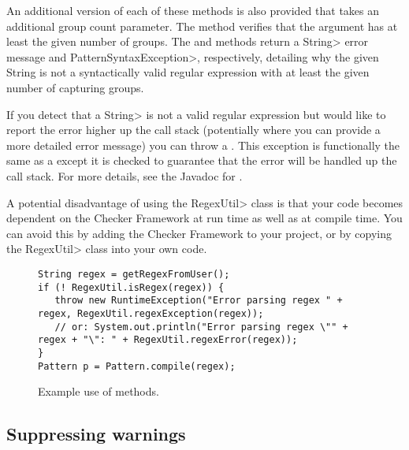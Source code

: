 An additional version of each of these methods is also provided that takes
an additional group count parameter. The
 method
verifies that the argument has at least the given number of groups. The
 and
methods return a \<String> error message and \<Pattern\-Syntax\-Exception>,
respectively, detailing why the given String is not a syntactically valid
regular expression with at least the given number of capturing groups.

If you detect that a \<String> is not a valid regular expression but would like
to report the error higher up the call stack (potentially where you can
provide a more detailed error message) you can throw a
. This exception is
functionally the same as a
except it is checked to guarantee that the error will be handled up the
call stack.  For more details, see the Javadoc for
.

A potential disadvantage of using the \<RegexUtil> class is that your code becomes
dependent on the Checker Framework at run time as well as at compile time.
You can avoid this by adding the Checker Framework to your project, or by
copying the \<RegexUtil> class into
your own code.

\begin{figure}
\begin{smaller}
\begin{Verbatim}
String regex = getRegexFromUser();
if (! RegexUtil.isRegex(regex)) {
   throw new RuntimeException("Error parsing regex " + regex, RegexUtil.regexException(regex));
   // or: System.out.println("Error parsing regex \"" + regex + "\": " + RegexUtil.regexError(regex));
}
Pattern p = Pattern.compile(regex);
\end{Verbatim}
\end{smaller}
\caption{Example use of  methods.}
\label{fig-regex-util-example}
\end{figure}


\subsection{Suppressing warnings}

